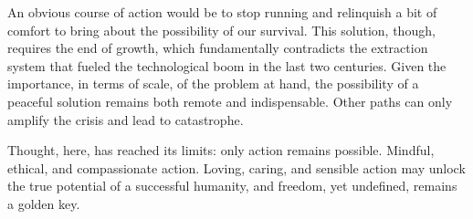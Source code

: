 An obvious course of action would be to stop running and relinquish a
bit of comfort to bring about the possibility of our survival. This
solution, though, requires the end of growth, which fundamentally
contradicts the extraction system that fueled the technological boom in
the last two centuries. Given the importance, in terms of scale, of the
problem at hand, the possibility of a peaceful solution remains both
remote and indispensable. Other paths can only amplify the crisis and
lead to catastrophe.

Thought, here, has reached its limits: only action remains possible.
Mindful, ethical, and compassionate action. Loving, caring, and sensible
action may unlock the true potential of a successful humanity, and
freedom, yet undefined, remains a golden key.
